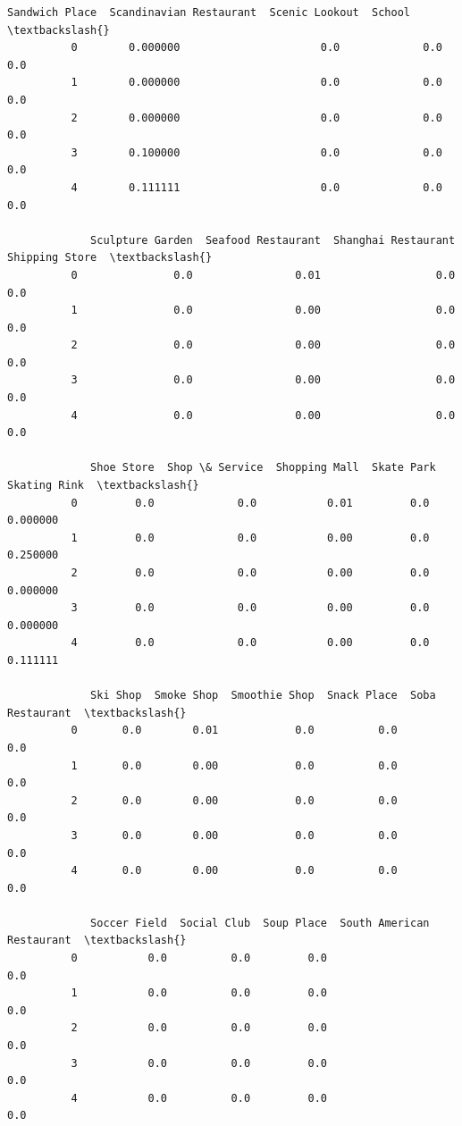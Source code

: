 \documentclass[11pt]{article}
\begin{document}
\begin{Verbatim}[commandchars=\\\{\}]
             Sandwich Place  Scandinavian Restaurant  Scenic Lookout  School  \textbackslash{}
          0        0.000000                      0.0             0.0     0.0   
          1        0.000000                      0.0             0.0     0.0   
          2        0.000000                      0.0             0.0     0.0   
          3        0.100000                      0.0             0.0     0.0   
          4        0.111111                      0.0             0.0     0.0   
          
             Sculpture Garden  Seafood Restaurant  Shanghai Restaurant  Shipping Store  \textbackslash{}
          0               0.0                0.01                  0.0             0.0   
          1               0.0                0.00                  0.0             0.0   
          2               0.0                0.00                  0.0             0.0   
          3               0.0                0.00                  0.0             0.0   
          4               0.0                0.00                  0.0             0.0   
          
             Shoe Store  Shop \& Service  Shopping Mall  Skate Park  Skating Rink  \textbackslash{}
          0         0.0             0.0           0.01         0.0      0.000000   
          1         0.0             0.0           0.00         0.0      0.250000   
          2         0.0             0.0           0.00         0.0      0.000000   
          3         0.0             0.0           0.00         0.0      0.000000   
          4         0.0             0.0           0.00         0.0      0.111111   
          
             Ski Shop  Smoke Shop  Smoothie Shop  Snack Place  Soba Restaurant  \textbackslash{}
          0       0.0        0.01            0.0          0.0              0.0   
          1       0.0        0.00            0.0          0.0              0.0   
          2       0.0        0.00            0.0          0.0              0.0   
          3       0.0        0.00            0.0          0.0              0.0   
          4       0.0        0.00            0.0          0.0              0.0   
          
             Soccer Field  Social Club  Soup Place  South American Restaurant  \textbackslash{}
          0           0.0          0.0         0.0                        0.0   
          1           0.0          0.0         0.0                        0.0   
          2           0.0          0.0         0.0                        0.0   
          3           0.0          0.0         0.0                        0.0   
          4           0.0          0.0         0.0                        0.0   
          

\end{Verbatim}
\end{document}
